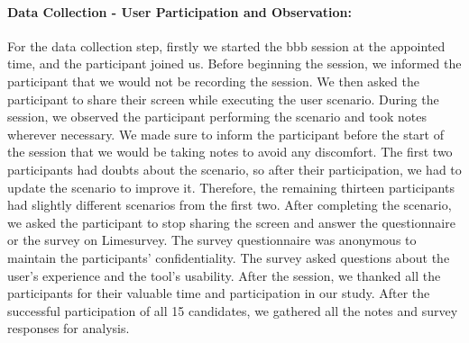 \paragraph{Data Collection - User Participation and Observation:}
For the data collection step, firstly we started the \ac{bbb} session at the appointed time, and the participant joined us. 
Before beginning the session, we informed the participant that we would not be recording the session. 
We then asked the participant to share their screen while executing the user scenario.
During the session, we observed the participant performing the scenario and took notes wherever necessary. 
We made sure to inform the participant before the start of the session that we would be taking notes to avoid any discomfort. 
The first two participants had doubts about the scenario, so after their participation, we had to update the scenario to improve it. 
Therefore, the remaining thirteen participants had slightly different scenarios from the first two.
After completing the scenario, we asked the participant to stop sharing the screen and answer the questionnaire or the survey on Limesurvey. 
The survey questionnaire was anonymous to maintain the participants' confidentiality. 
The survey asked questions about the user's experience and the tool's usability.
After the session, we thanked all the participants for their valuable time and participation in our study. 
After the successful participation of all 15 candidates, we gathered all the notes and survey responses for analysis.


